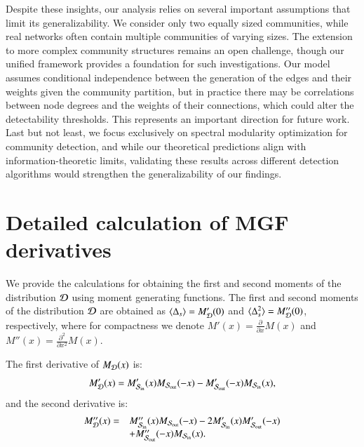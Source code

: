 \documentclass[a4paper,pre,superscriptaddress,floatfix,nofootinbib,twocolumn]{revtex4-1}
\begin{document}
Despite these insights, our analysis relies on several important assumptions that limit its generalizability. We consider only two equally sized communities, while real networks often contain multiple communities of varying sizes. The extension to more complex community structures remains an open challenge, though our unified framework provides a foundation for such investigations. Our model assumes %
conditional independence between the generation of the edges and their weights given the community partition,
but in practice there may be correlations between node degrees and the weights of their connections, which could alter the detectability thresholds. This represents an important direction for future work. Last but not least, we focus exclusively on spectral modularity optimization for community detection, and while our theoretical predictions align with information-theoretic limits, validating these results across different detection algorithms would strengthen the generalizability of our findings.





\appendix


\section{Detailed calculation of MGF derivatives}
\label{sec:moment_calculations}

We provide the calculations for obtaining the first and second moments of the distribution ${\cal D}$ using moment generating functions.
The first and second moments of the distribution ${\cal D}$ are obtained as $\langle \Delta_{s} \rangle = M'_{\cal D}(0)$ and $\langle \Delta_{s}^2 \rangle = M''_{\cal D}(0)$, respectively, where for compactness we denote $M'(x) = \frac{\partial}{\partial x} M(x)$ and $M''(x) = \frac{\partial^2}{\partial x^2} M(x)$.

The first derivative of $M_{\cal D}(x)$ is:
\[
M'_{\cal D}(x) = M'_{{\cal S}_\text{in}}(x) M_{{\cal S}_\text{out}}(-x) - M'_{{\cal S}_\text{out}}(-x) M_{{\cal S}_\text{in}}(x),
\]
and the second derivative is:
\[
\begin{array}{ll}
M''_{\cal D}(x) = & M''_{{\cal S}_\text{in}}(x) M_{{\cal S}_\text{out}}(-x) - 2 M'_{{\cal S}_\text{in}}(x) M'_{{\cal S}_\text{out}}(-x) \\
& + M''_{{\cal S}_\text{out}}(-x) M_{{\cal S}_\text{in}}(x).
\end{array}
\]
\end{document}
